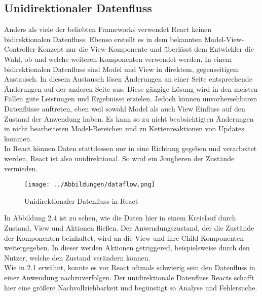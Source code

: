 \subsection{Unidirektionaler Datenfluss}
Anders als viele der beliebten Frameworks verwendet React keinen bidirektionalen Datenfluss. Ebenso erstellt es in dem bekannten Model-View-Controller Konzept nur die View-Komponente und überlässt dem Entwickler die Wahl, ob und welche weiteren Komponenten verwendet werden. In einem bidirektionalen Datenfluss sind Model und View in direktem, gegenseitigem Austausch. In diesem Austausch lösen Änderungen an einer Seite entsprechende Änderungen auf der anderen Seite aus. Diese gängige Lösung wird in den meisten Fällen gute Leistungen und Ergebnisse erzielen. Jedoch können unvorhersehbaren Datenflüsse auftreten, eben weil sowohl Model als auch View Einfluss auf den Zustand der Anwendung haben. Es kann so zu nicht beabsichtigten Änderungen in nicht bearbeiteten Model-Bereichen und zu Kettenreaktionen von Updates kommen.\\
In React können Daten stattdessen nur in eine Richtung gegeben und verarbeitet werden, React ist also unidirektional. So wird ein Jonglieren der Zustände vermieden. \\
\begin{figure}[H]
     \centerline{\texttt{[image: ../Abbildungen/dataflow.png]}}
  \caption{Unidirektionaler Datenfluss in React}
  \label{Unidirektionaler Datenfluss in React}
\end{figure}
\noindent In Abbildung 2.4 ist zu sehen, wie die Daten hier in einem Kreislauf durch Zustand, View und Aktionen fließen. Der Anwendungszustand, der die Zustände der Komponenten beinhaltet, wird an die View und ihre Child-Komponenten weitergegeben. In dieser werden Aktionen getriggered, beispielsweise durch den Nutzer, welche den Zustand verändern können. \\
Wie in 2.1 erwähnt, konnte es vor React oftmals schwierig sein den Datenfluss in einer Anwendung nachzuverfolgen. Der unidirektionale Datenfluss Reacts schafft hier eine größere Nachvollziehbarkeit und begünstigt so Analyse und Fehlersuche. \\
